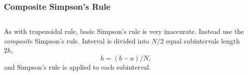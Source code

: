 \documentclass{beamer}
\begin{document}
\begin{frame}
  \frametitle{Composite Simpson's Rule}

  \begin{columns}
    \begin{column}{0.5\textwidth}
      \begin{overlayarea}{\textwidth}{0.8\textheight}
        {
          As with trapezoidal rule, basic Simpson's rule is
          very inaccurate.
        }
        {
          Instead use the \emph{composite}
          Simpson's rule.  Interval is divided into $N / 2$
          equal subintervals length $2 h$,
          \begin{equation*}
            h = (b - a) / N,
          \end{equation*}
          and Simpson's rule is applied to each subinterval.
        }
        {

}
\end{overlayarea}
\end{column}
\end{columns}
\end{frame}
\end{document}
